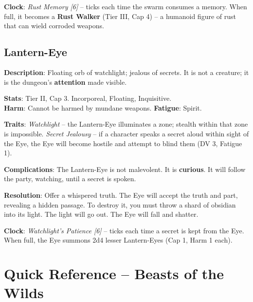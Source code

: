 \noindent\textbf{Clock}: \emph{Rust Memory [6]} -- ticks each time the swarm consumes a memory. When full, it becomes a \textbf{Rust Walker} (Tier III, Cap 4) -- a humanoid figure of rust that can wield corroded weapons.


\subsection*{Lantern-Eye}

\noindent\textbf{Description}: Floating orb of watchlight; jealous of secrets. It is not a creature; it is the dungeon's \textbf{attention} made visible.

\noindent\textbf{Stats}: Tier II, Cap 3. Incorporeal, Floating, Inquisitive.\\
\textbf{Harm}: Cannot be harmed by mundane weapons. \textbf{Fatigue}: Spirit.

\noindent\textbf{Traits}: 
\emph{Watchlight} -- the Lantern-Eye illuminates a zone; stealth within that zone is impossible. \emph{Secret Jealousy} -- if a character speaks a secret aloud within sight of the Eye, the Eye will become hostile and attempt to blind them (DV 3, Fatigue 1).

\noindent\textbf{Complications}: The Lantern-Eye is not malevolent. It is \textbf{curious}. It will follow the party, watching, until a secret is spoken.

\noindent\textbf{Resolution}: Offer a whispered truth. The Eye will accept the truth and part, revealing a hidden passage. To destroy it, you must throw a shard of obsidian into its light. The light will go out. The Eye will fall and shatter.

\noindent\textbf{Clock}: \emph{Watchlight's Patience [6]} -- ticks each time a secret is kept from the Eye. When full, the Eye summons 2d4 lesser Lantern-Eyes (Cap 1, Harm 1 each).


\section*{Quick Reference -- Beasts of the Wilds}


